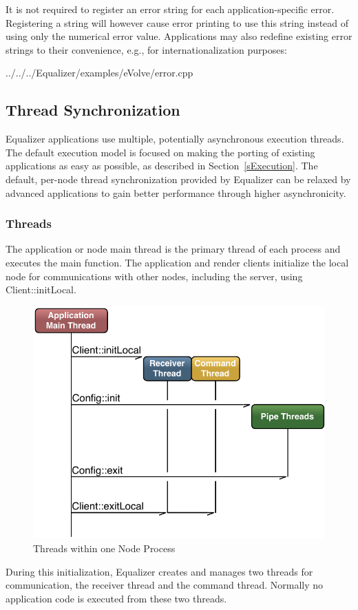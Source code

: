 \documentclass[10pt,a4]{scrartcl}
\newcommand{\sref}[1]{Section~\ref{#1}}
\begin{document}
It is not required to register an error string for each application-specific
error. Registering a string will however cause error printing to use this string
instead of using only the numerical error value. Applications may also redefine
existing error strings to their convenience, e.g., for internationalization
purposes:

{\footnotesize
  {../../../Equalizer/examples/eVolve/error.cpp}}


\subsection{\label{sThreads}Thread Synchronization}

Equalizer applications use multiple, potentially asynchronous execution
threads. The default execution model is focused on making the porting of
existing applications as easy as possible, as described in
\sref{sExecution}. The default, per-node thread synchronization provided
by Equalizer can be relaxed by advanced applications to gain better
performance through higher asynchronicity.

\subsubsection{Threads}

The application or node main thread is the primary thread of each
process and executes the \textsf{main} function. The application and
render clients initialize the local node for communications with other
nodes, including the server, using \textsf{Client::initLocal}.

\begin{figure}
  \includegraphics[width=.618\textwidth]{images/threads.pdf}
  {\caption{\label{fThreads}Threads within one Node Process}}
\end{figure}
During this initialization, Equalizer creates and manages two threads
for communication, the receiver thread and the command thread. Normally
no application code is executed from these two threads.
\end{document}
